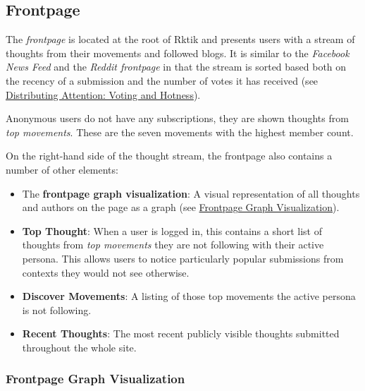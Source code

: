 \subsection{Frontpage}\label{frontpage}

The \emph{frontpage} is located at the root of Rktik and presents users
with a stream of thoughts from their movements and followed blogs. It is
similar to the \emph{Facebook News Feed} and the \emph{Reddit frontpage}
in that the stream is sorted based both on the recency of a submission
and the number of votes it has received (see
\hyperref[hotness]{Distributing Attention: Voting and Hotness}).

Anonymous users do not have any subscriptions, they are shown thoughts
from \emph{top movements}. These are the seven movements with the
highest member count.

On the right-hand side of the thought stream, the frontpage also
contains a number of other elements:

\begin{itemize}
\tightlist
\item
  The \textbf{frontpage graph visualization}: A visual representation of
  all thoughts and authors on the page as a graph (see
  \href{img/graph.png}{Frontpage Graph Visualization}).
\item
  \textbf{Top Thought}: When a user is logged in, this contains a short
  list of thoughts from \emph{top movements} they are not following with
  their active persona. This allows users to notice particularly popular
  submissions from contexts they would not see otherwise.
\item
  \textbf{Discover Movements}: A listing of those top movements the
  active persona is not following.
\item
  \textbf{Recent Thoughts}: The most recent publicly visible thoughts
  submitted throughout the whole site.
\end{itemize}

\subsubsection{Frontpage Graph
Visualization}\label{frontpage-graph-visualization}

